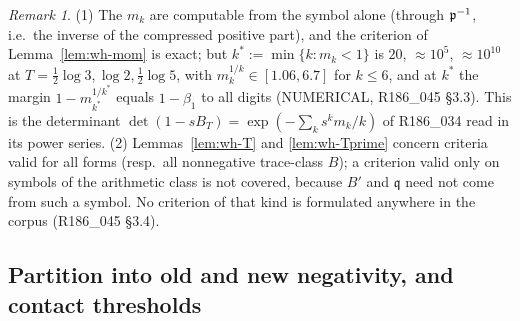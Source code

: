 \documentclass[11pt]{amsart}
\theoremstyle{definition}
\theoremstyle{remark}
\newtheorem{remark}[theorem]{Remark}
\begin{document}
\begin{remark}\label{rem:wh-mom}
(1) The $m_k$ are computable from the symbol alone (through $\mathfrak p^{-1}$, i.e.\ the inverse of the compressed positive
part), and the criterion of Lemma~\ref{lem:wh-mom} is exact; but $k^*:=\min\{k:m_k<1\}$ is $20$, $\approx10^5$, $\approx10^{10}$
at $T=\frac12\log3,\log2,\frac12\log5$, with $m_k^{1/k}\in[1.06,6.7]$ for $k\le6$, and at $k^*$ the margin $1-m_{k^*}^{1/k^*}$ equals
$1-\beta_1$ to all digits (NUMERICAL, R186\_045 \S3.3). This is the determinant $\det(1-sB_T)=\exp(-\sum_ks^km_k/k)$ of
R186\_034 read in its power series. (2) Lemmas~\ref{lem:wh-T} and \ref{lem:wh-Tprime} concern criteria valid for all
forms (resp.\ all nonnegative trace-class $B$); a criterion valid only on symbols of the arithmetic class is not covered,
because $B'$ and $\mathfrak q$ need not come from such a symbol. No criterion of that kind is formulated anywhere in the
corpus (R186\_045 \S3.4).
\end{remark}

\subsection{Partition into old and new negativity, and contact thresholds}\label{subsec:wh-oldnew}
\end{document}
